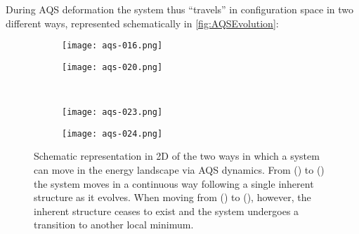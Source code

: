 During AQS deformation the system thus ``travels'' in configuration space in two different ways, represented schematically in \autoref{fig:AQSEvolution}:

\begin{figure}[!h]
	\centering
	\begin{subfigure}[b]{0.45\textwidth}
		\centering
		\texttt{[image: aqs-016.png]}
		\caption{\label{fig:AQSContinuousStart}}
	\end{subfigure} 
	\begin{subfigure}[b]{0.45\textwidth}
		\centering
		\texttt{[image: aqs-020.png]}
		\caption{\label{fig:AQSContinuousMiddle}}
	\end{subfigure} \\
	\begin{subfigure}[b]{0.45\textwidth}
		\centering
		\texttt{[image: aqs-023.png]}
		\caption{\label{fig:AQSContinuousEnd}}
	\end{subfigure} 
	\begin{subfigure}[b]{0.45\textwidth}
		\centering
		\texttt{[image: aqs-024.png]}
		\caption{\label{fig:AQSTransition}}
	\end{subfigure}
	\caption{
	Schematic representation in 2D of the two ways in which a system can move in the energy landscape via AQS dynamics. From () to () the system moves in a continuous way following a single inherent structure as it evolves. When moving from () to (), however, the inherent structure ceases to exist and the system undergoes a transition to another local minimum.\label{fig:AQSEvolution}}
\end{figure}

